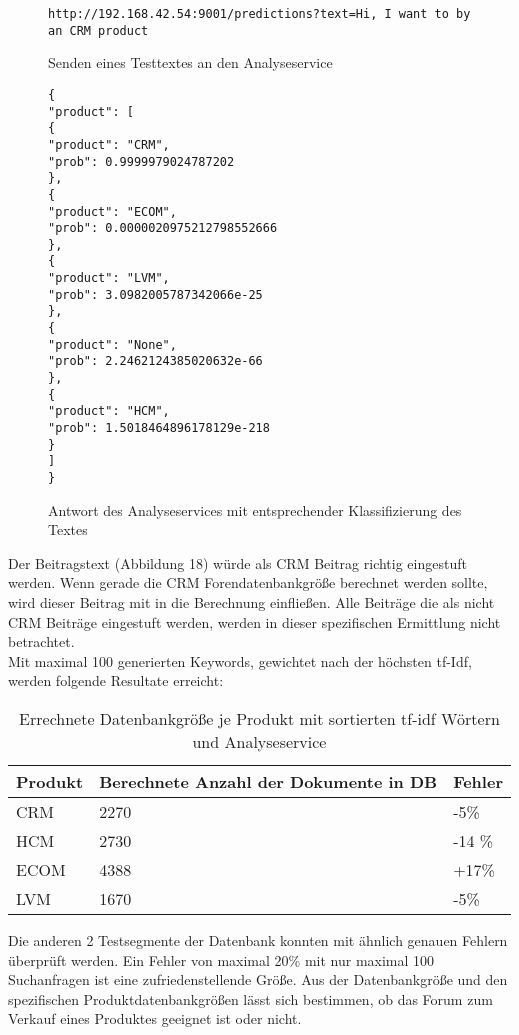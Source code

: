 \begin{figure}[h!]
\begin{lstlisting}[language=HTML5]
http://192.168.42.54:9001/predictions?text=Hi, I want to by an CRM product
\end{lstlisting}
\caption{Senden eines Testtextes an den Analyseservice}
\end{figure}

\newpage

\begin{figure}[h!]
\begin{lstlisting}[language=HTML5]
{
"product": [
{
"product": "CRM",
"prob": 0.9999979024787202
},
{
"product": "ECOM",
"prob": 0.0000020975212798552666
},
{
"product": "LVM",
"prob": 3.0982005787342066e-25
},
{
"product": "None",
"prob": 2.2462124385020632e-66
},
{
"product": "HCM",
"prob": 1.5018464896178129e-218
}
]
}
\end{lstlisting}
\caption{Antwort des Analyseservices mit entsprechender Klassifizierung des Textes}
\end{figure}

Der Beitragstext (Abbildung 18) würde als CRM Beitrag richtig eingestuft werden. Wenn gerade die CRM Forendatenbankgröße berechnet werden sollte, wird dieser Beitrag mit in die Berechnung einfließen. Alle Beiträge die als nicht CRM Beiträge eingestuft werden, werden in dieser spezifischen Ermittlung nicht betrachtet.\\
Mit maximal 100 generierten Keywords, gewichtet nach der höchsten tf-Idf, werden folgende Resultate erreicht:

\begin{table}[h!]
\begin{tabular}{ | p{3cm} | l | l |}
\hline
Produkt & Berechnete Anzahl der Dokumente in DB & Fehler \\ \hline
CRM & 2270 & -5\% \\ \hline
HCM & 2730 & -14 \% \\ \hline
ECOM & 4388 & +17\% \\ \hline
LVM & 1670 & -5\% \\ \hline
\end{tabular}
\caption{Errechnete Datenbankgröße je Produkt mit sortierten tf-idf Wörtern und Analyseservice}
\end{table}

Die anderen 2 Testsegmente der Datenbank konnten mit ähnlich genauen Fehlern überprüft werden.
Ein Fehler von maximal 20\% mit nur maximal 100 Suchanfragen ist eine zufriedenstellende Größe. Aus der Datenbankgröße und den spezifischen Produktdatenbankgrößen lässt sich bestimmen, ob das Forum zum Verkauf eines Produktes geeignet ist oder nicht.
